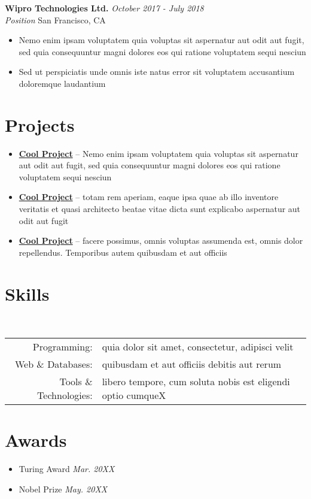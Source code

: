 \documentclass[letterpaper,10pt]{article}
\newcommand{\organization}[4]{
    \vspace{1.5pt}
    \textbf{#1} \hfill{\emph{#2}} \\
    \emph{#3} \hfill{#4} \\
    \vspace{3pt}
}
\newcommand{\pro}[3]{
    \item \href{#2}{\textbf{#1}} -- {#3}
}
\newcommand{\skills}[3]{
    \vspace{-2pt}
    \ \ \ \ \ \ \ \ \ \ \ 
    \begin{tabular}{r!{\color{burgundy}\vrule}l}
          Programming: & #1 \\
          Web \& Databases: & #2 \\
          Tools \& Technologies: & #3
    \end{tabular}
    \vspace{4pt}
}
\newcommand{\activity}[2]{
    \item #1 \hfill{\emph{#2}}      
}
\newcommand{\bulletsBegin}{
    \vspace{1pt}
    \begin{minipage}{17.6cm} 
    \begin{itemize}[leftmargin=0.6cm]
    \setlength\itemsep{-0.009em}
}
\newcommand{\bulletsEnd}{
    \end{itemize}\vspace{0pt}
    \end{minipage}
}
\newcommand{\bulletsBeginn}{
    \vspace{1pt}
    \begin{minipage}{18cm} 
    \begin{itemize}[leftmargin=0.6cm]
}
\newcommand{\bulletsEndd}{
    \end{itemize}\vspace{0pt}
    \end{minipage}
}
\begin{document}
        \organization{Wipro Technologies Ltd.}{October 2017 - July 2018}
        {Position}{San Francisco, CA}
        \bulletsBegin
            \item Nemo enim ipsam voluptatem quia voluptas sit aspernatur aut odit aut fugit, sed quia consequuntur magni dolores eos qui ratione voluptatem sequi nesciun
            \item Sed ut perspiciatis unde omnis iste natus error sit voluptatem accusantium doloremque laudantium
        \bulletsEnd

    \section{Projects}

    
        \bulletsBegin
            \vspace{-3pt}
        \pro{Cool Project}
            {https://github.com/example/project}
            {Nemo enim ipsam voluptatem quia voluptas sit aspernatur aut odit aut fugit, sed quia consequuntur magni dolores eos qui ratione voluptatem sequi nesciun}
        \pro{Cool Project}
            {https://github.com/example/project}
            {totam rem aperiam, eaque ipsa quae ab illo inventore veritatis et quasi architecto beatae vitae dicta sunt explicabo aspernatur aut odit aut fugit}
        \pro{Cool Project}
            {https://github.com/example/project}
            {facere possimus, omnis voluptas assumenda est, omnis dolor repellendus. Temporibus autem quibusdam et aut officiis}
        
        
        \bulletsEnd

    \section{Skills}
    
    \skills
        {quia dolor sit amet, consectetur, adipisci velit}               %
        {quibusdam et aut officiis debitis aut rerum}               %
        { libero tempore, cum soluta nobis est eligendi optio cumqueX}                             %

    
    \section{Awards}

    \bulletsBeginn
        \activity{Turing Award}{Mar. 20XX}
        \vspace{-4pt}
        \activity{Nobel Prize}{May. 20XX}
    \bulletsEndd

\end{document}
